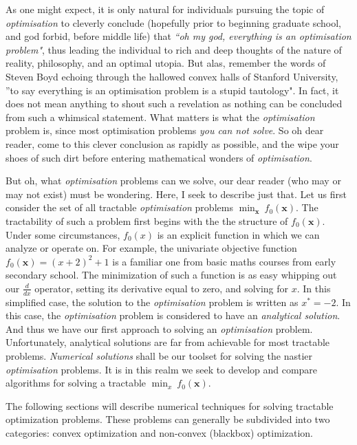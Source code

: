 As one might expect, it is only natural for individuals pursuing the topic of \textit{optimisation} to cleverly conclude (hopefully prior to beginning graduate school, and god forbid, before middle life) that \textit{``oh my god, everything is an optimisation problem"}, thus leading the individual to rich and deep thoughts of the nature of reality, philosophy, and an optimal utopia. But alas, remember the words of Steven Boyd echoing through the hallowed convex halls of Stanford University, ''to say everything is an optimisation problem is a stupid tautology". In fact, it does not mean anything to shout such a revelation as nothing can be concluded from such a whimsical statement. What matters is what the \textit{optimisation} problem is, since most optimisation problems \textit{you can not solve}. So oh dear reader, come to this clever conclusion as rapidly as possible, and the wipe your shoes of such dirt before entering mathematical wonders of \textit{optimisation}. 

But oh, what \textit{optimisation} problems can we solve, our dear reader (who may or may not exist) must be wondering. Here, I seek to describe just that. Let us first consider the set of all tractable \textit{optimisation} problems $\min_{\boldsymbol{x}} \ f_0(\boldsymbol{x})$. The tractability of such a problem first begins with the the structure of $f_0(\boldsymbol{x})$. Under some circumstances, $f_0(x)$ is an explicit function in which we can analyze or operate on. For example, the univariate objective function $f_0(\boldsymbol{x}) = (x + 2)^2 + 1$ is a familiar one from basic maths courses from early secondary school. The minimization of such a function is as easy whipping out our $\frac{d}{dx}$ operator, setting its derivative equal to zero, and solving for $x$. In this simplified case, the solution to the \textit{optimisation} problem is written as $x^\ast = -2$. In this case, the \textit{optimisation} problem is considered to have an \textit{analytical solution}. And thus we have our first approach to solving an \textit{optimisation} problem. Unfortunately, analytical solutions are far from achievable for most tractable problems. \textit{Numerical solutions} shall be our toolset for solving the nastier \textit{optimisation} problems. It is in this realm we seek to develop and compare algorithms for solving a tractable $\min_{x} \ f_0(\boldsymbol{x})$. 

The following sections will describe numerical techniques for solving tractable optimization problems. These problems can generally be subdivided into two categories: convex optimization and non-convex (blackbox) optimization. 

